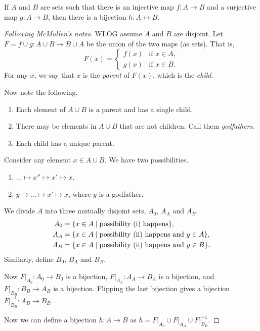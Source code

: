 \begin{theorem*} \label{thm:schroder-bernstein}
    If $A$ and $B$ are sets such that there is an injective map
    $f\colon A \to B$ and a surjective map $g\colon A \to B$,
    then there is a bijection $h\colon A \leftrightarrow B$.
\end{theorem*}
\begin{proof}[Following McMullen's notes]
    WLOG assume $A$ and $B$ are disjoint.
    Let $F = f \cup g\colon A \cup B \to B \cup A$ be the union of the two
    maps (as sets).
    That is, \[
        F(x) = \begin{cases}
            f(x) & \text{if } x \in A, \\
            g(x) & \text{if } x \in B.
        \end{cases}
    \] For any $x$, we say that $x$ is the \emph{parent} of $F(x)$,
    which is the \emph{child}.

    Now note the following.
    \begin{enumerate}
        \item Each element of $A \cup B$ is a parent and has a single child.
        \item There may be elements in $A \cup B$ that are not children.
            Call them \emph{godfathers}.
        \item Each child has a unique parent.
    \end{enumerate}
    Consider any element $x \in A \cup B$.
    We have two possibilities.
    \begin{enumerate}
        \item $\dots \mapsto x'' \mapsto x' \mapsto x$.
        \item $y \mapsto \dots \mapsto x' \mapsto x$,
            where $y$ is a godfather.
    \end{enumerate}
    We divide $A$ into three mutually disjoint sets, $A_0$, $A_A$ and $A_B$.
    \begin{align*}
        A_0  &= \{x \in A
                    \mid \text{possibility (i) happens}\}, \\
        A_A &= \{x \in A
                    \mid \text{possibility (ii) happens and $y \in A$}\}, \\
        A_B &= \{x \in A
                    \mid \text{possibility (ii) happens and $y \in B$}\}.
    \end{align*}
    Similarly, define $B_0$, $B_A$ and $B_B$.

    Now $F\vert_{A_0} : A_0 \to B_0$ is a bijection,
    $F\vert_{A_A} : A_A \to B_A$ is a bijection, and
    $F\vert_{B_B} : B_B \to A_B$ is a bijection.
    Flipping the last bijection gives a bijection
    $F\vert_{B_B}^{-1} : A_B \to B_B$.

    Now we can define a bijection $h\colon A \to B$ as
    $h = F\vert_{A_0} \cup F\vert_{A_A} \cup F\vert_{B_B}^{-1}$.
\end{proof}
